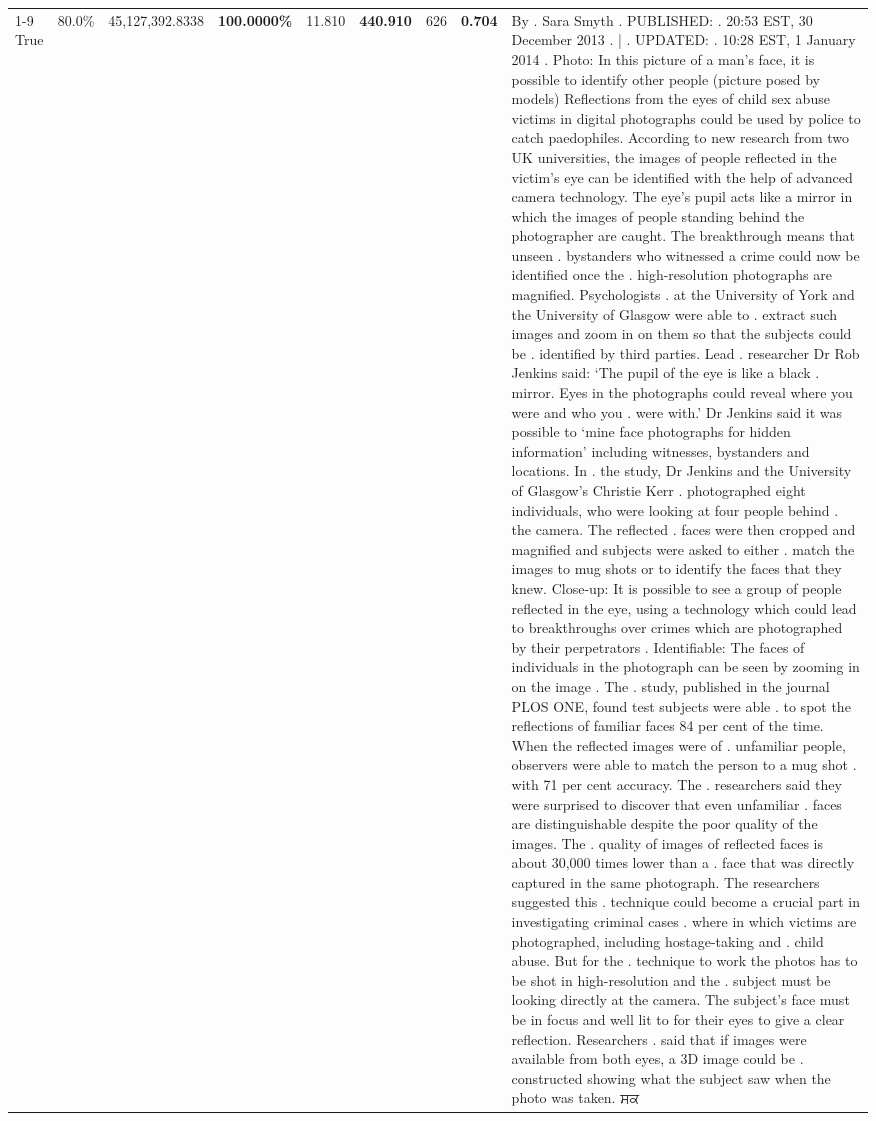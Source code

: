 \begin{table}[H]
\begin{tabular}{lllrlllll}
\cline{1-9}
True & 80.0\% & 45,127,392.8338 & \bfseries \color{red} 100.0000\% & 11.810 & \bfseries \color{red} 440.910 & 626 & \bfseries \color{red} 0.704 & By . Sara Smyth . PUBLISHED: . 20:53 EST, 30 December 2013 . | . UPDATED: . 10:28 EST, 1 January 2014 . Photo: In this picture of a man's face, it is possible to identify other people (picture posed by models) Reflections from the eyes of child sex abuse victims in digital photographs could be used by police to catch paedophiles. According to new research from two UK universities, the images of people reflected in the victim's eye can be identified with the help of advanced camera technology. The eye's pupil acts like a mirror in which the images of people standing behind the photographer are caught. The breakthrough means that unseen . bystanders who witnessed a crime could now be identified once the . high-resolution photographs are magnified. Psychologists . at the University of York and the University of Glasgow were able to . extract such images and zoom in on them so that the subjects could be . identified by third parties. Lead . researcher Dr Rob Jenkins said: ‘The pupil of the eye is like a black . mirror. Eyes in the photographs could reveal where you were and who you . were with.' Dr Jenkins said it was possible to ‘mine face photographs for hidden information' including witnesses, bystanders and locations. In . the study, Dr Jenkins and the University of Glasgow's Christie Kerr . photographed eight individuals, who were looking at four people behind . the camera. The reflected . faces were then cropped and magnified and subjects were asked to either . match the images to mug shots or to identify the faces that they knew. Close-up: It is possible to see a group of people reflected in the eye, using a technology which could lead to breakthroughs over crimes which are photographed by their perpetrators . Identifiable: The faces of individuals in the photograph can be seen by zooming in on the image . The . study, published in the journal PLOS ONE, found test subjects were able . to spot the reflections of familiar faces 84 per cent of the time. When the reflected images were of . unfamiliar people, observers were able to match the person to a mug shot . with 71 per cent accuracy. The . researchers said they were surprised to discover that even unfamiliar . faces are distinguishable despite the poor quality of the images. The . quality of images of reflected faces is about 30,000 times lower than a . face that was directly captured in the same photograph. The researchers suggested this . technique could become a crucial part in investigating criminal cases . where in which victims are photographed, including hostage-taking and . child abuse. But for the . technique to work the photos has to be shot in high-resolution and the . subject must be looking directly at the camera. The subject's face must be in focus and well lit to for their eyes to give a clear reflection. Researchers . said that if images were available from both eyes, a 3D image could be . constructed showing what the subject saw when the photo was taken. ਸਕ \\

\end{tabular}
\end{table}
